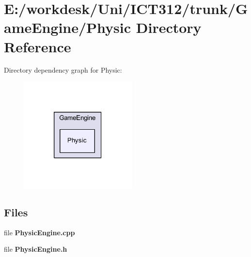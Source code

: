 \section{E\+:/workdesk/\+Uni/\+I\+C\+T312/trunk/\+Game\+Engine/\+Physic Directory Reference}
\label{dir_cb1d01db45fc3f1da36ae3130932cd0c}
Directory dependency graph for Physic\+:\nopagebreak
\begin{figure}[H]
\begin{center}
\leavevmode
\includegraphics[width=169pt]{dir_cb1d01db45fc3f1da36ae3130932cd0c_dep}
\end{center}
\end{figure}
\subsection*{Files}
\begin{DoxyCompactItemize}
\item 
file {\bf Physic\+Engine.\+cpp}
\item 
file {\bf Physic\+Engine.\+h}
\end{DoxyCompactItemize}

